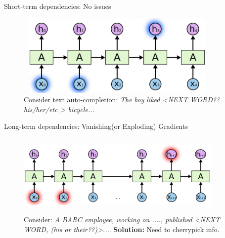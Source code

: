 \documentclass{beamer}
\begin{document}
\begin{frame}{Short-term dependencies: No issues}
    \begin{center}
                 \begin{figure}
            \centering
             \includegraphics[width=10cm, height=4cm]{images/rnn_long_range_prob_1_colah.png}
            \caption{ Consider text auto-completion: \textit{The boy liked \big<NEXT WORD?? his/her/etc \big> bicycle...}}
            
        \end{figure}  
    \end{center}
\end{frame}

\begin{frame}{Long-term dependencies: Vanishing(or Exploding) Gradients}
    \begin{center}
        \begin{figure}
            \centering
            \includegraphics[width=10cm,height=4cm]{images/rnn_long_range_prob_2_colah.png}
            \caption{ Consider: \textit{A BARC employee, working on ...., published \big<NEXT WORD, \textit{(his or their??)}\big>...}. \textbf{Solution:} Need to cherrypick info.}
            \label{fig:my_label}
        \end{figure}
        
        
    \end{center}
\end{frame}
\end{document}
